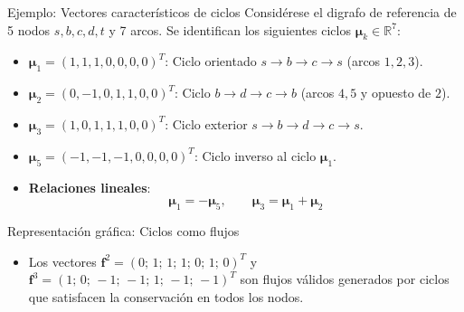 \documentclass[
  ignorenonframetext,
]{beamer}
\providecommand{\tightlist}{%
  \setlength{\itemsep}{0pt}\setlength{\parskip}{0pt}}
\begin{document}
\begin{frame}{Ejemplo: Vectores característicos de ciclos}
\label{ejemplo-vectores-caracteruxedsticos-de-ciclos}
Considérese el digrafo de referencia de 5 nodos \(s, b, c, d, t\) y 7
arcos. Se identifican los siguientes ciclos
\(\mathbf{\mu}_k \in \mathbb{R}^7\):

\begin{itemize}
\item
  \(\mathbf{\mu}_1 = (1, 1, 1, 0, 0, 0, 0)^T\): Ciclo orientado
  \(s \to b \to c \to s\) (arcos \(1, 2, 3\)).
\item
  \(\mathbf{\mu}_2 = (0, -1, 0, 1, 1, 0, 0)^T\): Ciclo
  \(b \to d \to c \to b\) (arcos \(4, 5\) y opuesto de \(2\)).
\item
  \(\mathbf{\mu}_3 = (1, 0, 1, 1, 1, 0, 0)^T\): Ciclo exterior
  \(s \to b \to d \to c \to s\).
\item
  \(\mathbf{\mu}_5 = (-1, -1, -1, 0, 0, 0, 0)^T\): Ciclo inverso al
  ciclo \(\mathbf{\mu}_1\).
\item
  \textbf{Relaciones lineales}:
  \[\mathbf{\mu}_1 = -\mathbf{\mu}_5, \qquad \mathbf{\mu}_3 = \mathbf{\mu}_1 + \mathbf{\mu}_2\]
\end{itemize}
\end{frame}

\begin{frame}{Representación gráfica: Ciclos como flujos}
\label{representaciuxf3n-gruxe1fica-ciclos-como-flujos}
\begin{itemize}
\tightlist
\item
  Los vectores \(\mathbf{f}^2 = (0;\, 1;\, 1;\, 1;\, 0;\, 1;\, 0)^T\) y
  \(\mathbf{f}^3 = (1;\, 0;\, -1;\, -1;\, 1;\, -1;\, -1)^T\) son flujos
  válidos generados por ciclos que satisfacen la conservación en todos
  los nodos.
\end{itemize}
\end{frame}
\end{document}
